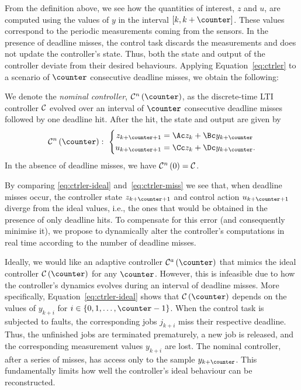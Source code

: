 From the definition above, we see how the quantities of interest, $z$ and $u$, are computed using the values of $y$ in the interval $\left[ k, k+\counter \right]$. 
These values correspond to the periodic measurements coming from the sensors.
%
In the presence of deadline misses, the control task discards the measurements and does not update the controller's state.
Thus, both the state and output of the controller deviate from their desired behaviours. 
Applying Equation~\eqref{eq:ctrler} to a scenario of $\counter$ consecutive deadline misses, we obtain the following:

\begin{definition}
    We denote the \emph{nominal controller}, $\ctrler^n\funof{\counter}$, as the discrete-time LTI controller $\mathcal{C}$ evolved over an interval of $\counter$ consecutive deadline misses followed by one deadline hit. 
    After the hit, the state and output are given by
    \begin{equation}
        \label{eq:ctrler-miss}
        \ctrler^n\funof{\counter}:\,\, 
        \left\{\begin{aligned}
            z_{k+\counter+1} &= \Ac z_{k} + \Bc y_{k+\counter}\\
            u_{k+\counter+1} &= \Cc z_{k} + \Dc y_{k+\counter}.
        \end{aligned}\right.
    \end{equation}
    In the absence of deadline misses, we have $\mathcal{C}^n\left( 0 \right) = \mathcal{C}$.
\end{definition}

By comparing \eqref{eq:ctrler-ideal} and~\eqref{eq:ctrler-miss} we see that, when deadline misses occur, the controller state $z_{k+\counter+1}$ and control action $u_{k+\counter+1}$ diverge from the ideal values, i.e., the ones that would be obtained in the presence of only deadline hits. 
To compensate for this error (and consequently minimise it), we propose to
dynamically alter the controller's computations in real time according to the number of deadline misses. 

Ideally, we would like an adaptive controller $\ctrler^a\funof{\counter}$ that mimics the ideal controller $\ctrler\funof{\counter}$ for any $\counter$.
However, this is infeasible due to how the controller's dynamics evolves during an interval of deadline misses.
More specifically, Equation~\eqref{eq:ctrler-ideal} shows that $\ctrler\funof{\counter}$ depends on the values of $y_{k+i}$ for $i \in \left\{ 0, 1, \ldots, \counter-1 \right\}$.
When the control task is subjected to faults, the corresponding jobs $j_{k+i}$ miss their respective deadline. 
Thus, the unfinished jobs are terminated prematurely, a new job is released, and the corresponding measurement values $y_{k+i}$ are lost.
The nominal controller, after a series of misses, has access only to the sample $y_{k+\counter}$.
This fundamentally limits how well the controller's ideal behaviour can be reconstructed.

